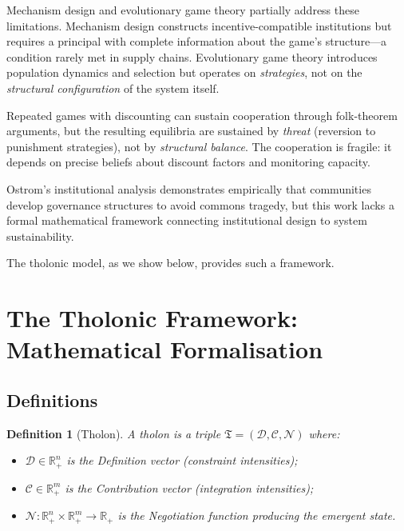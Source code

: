 \documentclass[12pt,a4paper,twocolumn]{article}
\newtheorem{definition}{Definition}[section]
\newcommand{\N}{\mathcal{N}}
\newcommand{\D}{\mathcal{D}}
\newcommand{\CC}{\mathcal{C}}
\newcommand{\R}{\mathbb{R}}
\newcommand{\tholon}{\mathfrak{T}}
\begin{document}
Mechanism design \citep{Myerson1981} and evolutionary game theory \citep{MaynardSmith1982} partially address these limitations.
Mechanism design constructs incentive-compatible institutions but requires a principal with complete information about the game's structure---a condition rarely met in supply chains.
Evolutionary game theory introduces population dynamics and selection but operates on \emph{strategies}, not on the \emph{structural configuration} of the system itself.

Repeated games with discounting \citep{Fudenberg1991} can sustain cooperation through folk-theorem arguments, but the resulting equilibria are sustained by \emph{threat} (reversion to punishment strategies), not by \emph{structural balance}.
The cooperation is fragile: it depends on precise beliefs about discount factors and monitoring capacity.

Ostrom's institutional analysis \citep{Ostrom1990,Ostrom2005} demonstrates empirically that communities develop governance structures to avoid commons tragedy, but this work lacks a formal mathematical framework connecting institutional design to system sustainability.

The tholonic model, as we show below, provides such a framework.

\section{The Tholonic Framework: Mathematical Formalisation}
\label{sec:tholonic}

\subsection{Definitions}

\begin{definition}[Tholon]
\label{def:tholon}
A \emph{tholon} is a triple $\tholon = (\D, \CC, \N)$ where:
\begin{itemize}[nosep]
  \item $\D \in \R^n_+$ is the \emph{Definition vector} (constraint intensities);
  \item $\CC \in \R^m_+$ is the \emph{Contribution vector} (integration intensities);
  \item $\N: \R^n_+ \times \R^m_+ \to \R_+$ is the \emph{Negotiation function} producing the emergent state.
\end{itemize}
\end{definition}
\end{document}
